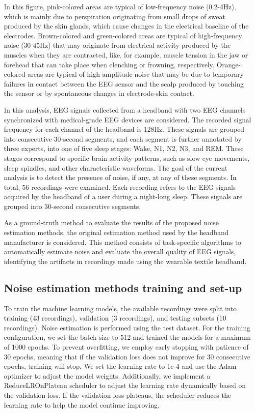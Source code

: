 \documentclass[conference]{IEEEtran}
\begin{document}
In this figure, pink-colored areas are typical of low-frequency noise (0.2-4Hz), which is mainly due to perspiration originating from small drops of sweat produced by the skin glands, which cause changes in the electrical baseline of the electrodes. Brown-colored and green-colored areas are typical of high-frequency noise (30-45Hz) that may originate from electrical activity produced by the muscles when they are contracted, like, for example, muscle tension in the jaw or forehead that can take place when clenching or frowning, respectively. Orange-colored areas are typical of high-amplitude noise that may be due to temporary failures in contact between the EEG sensor and the scalp produced by touching the sensor or by spontaneous changes in electrode-skin contact.

In this analysis, EEG signals collected from a headband with two EEG channels synchronized with medical-grade EEG devices are considered. The recorded signal frequency for each channel of the headband is 128Hz. These signals are grouped into consecutive 30-second segments, and each segment is further annotated by three experts, into one of five sleep stages: Wake, N1, N2, N3, and REM. These stages correspond to specific brain activity patterns, such as slow eye movements, sleep spindles, and other characteristic waveforms. The goal of the current analysis is to detect the presence of noise, if any, at any of these segments. In total, 56 recordings were examined. Each recording refers to the EEG signals acquired by the headband of a user during a night-long sleep. These signals are grouped into 30-second consecutive segments.

As a ground-truth method to evaluate the results of the proposed noise estimation methods, the original estimation method used by the headband manufacturer is considered. This method consists of task-specific algorithms to automatically estimate noise and evaluate the overall quality of EEG signals, identifying the artifacts in recordings made using the wearable textile headband.

\subsection{Noise estimation methods training and set-up}

To train the machine learning models, the available recordings were
split into training (43 recordings), validation (3 recordings), and
testing subsets (10 recordings). Noise estimation is performed using
the test dataset. For the training configuration, we set the batch
size to 512 and trained the models for a maximum of 1000 epochs. To
prevent overfitting, we employ early stopping with patience of 30
epochs, meaning that if the validation loss does not improve for 30
consecutive epochs, training will stop. We set the learning rate to
1e-4 and use the Adam optimizer to adjust the model
weights. Additionally, we implement a ReduceLROnPlateau scheduler to
adjust the learning rate dynamically based on the validation loss. If
the validation loss plateaus, the scheduler reduces the learning rate
to help the model continue improving.
\end{document}
